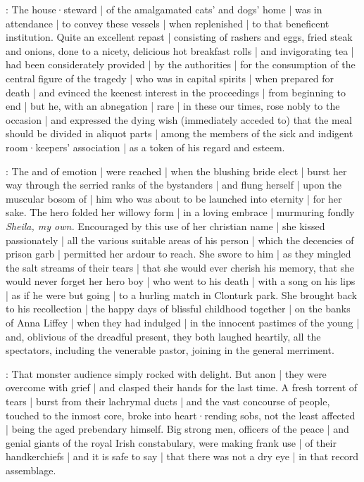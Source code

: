 :
The house·steward |
of the amalgamated cats' and dogs' home |
was in attendance |
to convey these vessels |
when replenished |
to that beneficent institution.
Quite an excellent repast |
consisting of rashers and eggs,
fried steak and onions,
done to a nicety,
delicious hot breakfast rolls |
and invigorating tea |
had been considerately provided |
by the authorities |
for the consumption of the central figure of the tragedy
 |
who was in capital spirits |
when prepared for death |
and evinced the keenest interest in the proceedings |
from beginning to end |
but he,
with an abnegation |
rare |
in these our times,
rose nobly to the occasion |
and expressed the dying wish
(immediately acceded to)
that the meal should be divided in aliquot parts |
among the members of the sick and indigent room·keepers' association |
as a token of his regard and esteem.

:
The  and  of emotion |
were reached |
when the blushing bride elect |
burst her way through the serried ranks of the bystanders |
and flung herself |
upon the muscular bosom of |
him who was about to be launched into eternity |
for her sake.
The hero folded her willowy form |
in a loving embrace |
murmuring fondly
\emph{Sheila,
my own.}
Encouraged by this use of her christian name |
she kissed passionately |
all the various suitable areas of his person |
which the decencies of prison garb |
permitted her ardour to reach.
She swore to him |
as they mingled the salt streams of their tears |
that she would ever cherish his memory,
that she would never forget her hero boy |
who went to his death |
with a song on his lips |
as if he were but going |
to a hurling match in Clonturk park.
She brought back to his recollection |
the happy days of blissful childhood together |
on the banks of Anna Liffey |
when they had indulged |
in the innocent pastimes of the young |
and,
oblivious of the dreadful present,
they both laughed heartily,
all the spectators,
including the venerable pastor,
joining in the general merriment.

:
That monster audience simply rocked with delight.
But anon |
they were overcome with grief |
and clasped their hands for the last time.
A fresh torrent of tears |
burst from their lachrymal ducts |
and the vast concourse of people,
touched to the inmost core,
broke into heart·rending sobs,
not the least affected |
being the aged prebendary himself.
Big strong men,
officers of the peace |
and genial giants of the royal Irish constabulary,
were making frank use |
of their handkerchiefs |
and it is safe to say |
that there was not a dry eye |
in that record assemblage.

